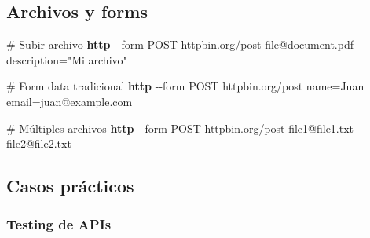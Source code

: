 \documentclass[
  11pt,
  letterpaper,
  oneside,
  openany]{scrbook}
\newenvironment{Shaded}{}{}
\newcommand{\AttributeTok}[1]{\textcolor[rgb]{0.84,0.23,0.29}{#1}}
\newcommand{\CommentTok}[1]{\textcolor[rgb]{0.42,0.45,0.49}{#1}}
\newcommand{\ExtensionTok}[1]{\textcolor[rgb]{0.84,0.23,0.29}{\textbf{#1}}}
\newcommand{\NormalTok}[1]{\textcolor[rgb]{0.14,0.16,0.18}{#1}}
\newcommand{\StringTok}[1]{\textcolor[rgb]{0.01,0.18,0.38}{#1}}
\begin{document}
\subsection{Archivos y forms}\label{archivos-y-forms}

\begin{Shaded}
\begin{Highlighting}[]
\CommentTok{\# Subir archivo}
\ExtensionTok{http} \AttributeTok{{-}{-}form}\NormalTok{ POST httpbin.org/post file@document.pdf description=}\StringTok{"Mi archivo"}

\CommentTok{\# Form data tradicional}
\ExtensionTok{http} \AttributeTok{{-}{-}form}\NormalTok{ POST httpbin.org/post name=Juan email=juan@example.com}

\CommentTok{\# Múltiples archivos}
\ExtensionTok{http} \AttributeTok{{-}{-}form}\NormalTok{ POST httpbin.org/post file1@file1.txt file2@file2.txt}
\end{Highlighting}
\end{Shaded}

\subsection{Casos prácticos}\label{casos-pruxe1cticos}

\subsubsection{Testing de APIs}\label{testing-de-apis}
\end{document}
